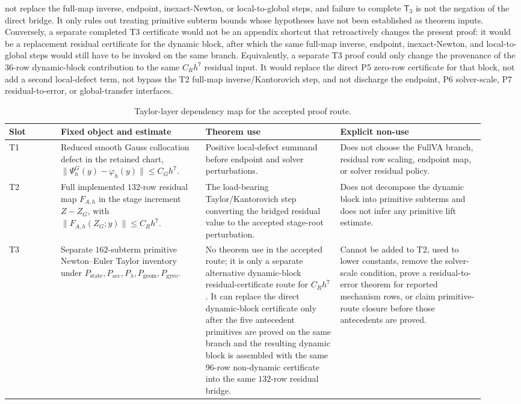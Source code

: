 \documentclass[preprint,12pt]{elsarticle}
\begin{document}
not replace the full-map inverse, endpoint, inexact-Newton, or local-to-global
steps, and failure to complete \(\mathsf T_3\) is not the negation of the
direct bridge.  It only rules out treating primitive subterm bounds whose
hypotheses have not been established as theorem inputs.
Conversely, a separate completed T3 certificate would not be an appendix shortcut that
retroactively changes the present proof: it would be a replacement residual
certificate for the dynamic block, after which the same full-map inverse,
endpoint, inexact-Newton, and local-to-global steps would still have to be
invoked on the same branch.
Equivalently, a separate T3 proof could only change the provenance of the
36-row dynamic-block contribution to the same \(C_Rh^7\) residual input.  It
would replace the direct P5 zero-row certificate for that block, not add a
second local-defect term, not bypass the T2 full-map inverse/Kantorovich
step, and not discharge the endpoint, P6 solver-scale, P7 residual-to-error,
or global-transfer interfaces.

\begin{table}[htbp]
\centering
\caption{Taylor-layer dependency map for the accepted proof route.}
\label{tab:taylor-layer-consumption-ledger}
\scriptsize
\setlength{\tabcolsep}{2pt}
\renewcommand{\arraystretch}{0.92}
\begin{tabular}{P{0.10\linewidth}P{0.28\linewidth}P{0.26\linewidth}P{0.28\linewidth}}
\toprule
Slot & Fixed object and estimate & Theorem use & Explicit non-use \\
\midrule
T1 &
Reduced smooth Gauss collocation defect in the retained chart,
\(\|\Psi_h^G(y)-\varphi_h(y)\|\le C_Gh^7\). &
Positive local-defect summand before endpoint and solver perturbations. &
Does not choose the FullVA branch, residual row scaling, endpoint map, or
solver residual policy. \\
T2 &
Full implemented \(132\)-row residual map \(F_{A,h}\) in the stage increment
\(Z-Z_G\), with \(\|F_{A,h}(Z_G;y)\|\le C_Rh^7\). &
The load-bearing Taylor/Kantorovich step converting the bridged residual value
to the accepted stage-root perturbation. &
Does not decompose the dynamic block into primitive subterms and does not
infer any primitive lift estimate. \\
T3 &
Separate \(162\)-subterm primitive Newton--Euler Taylor inventory under
\(P_{\mathrm{state}},P_{\mathrm{acc}},P_{\lambda},
P_{\mathrm{geom}},P_{\mathrm{gyro}}\). &
No theorem use in the accepted route; it is only a separate alternative
dynamic-block residual-certificate route for \(C_Rh^7\).
It can replace the direct dynamic-block certificate only after the five
antecedent primitives are proved on the same branch and the resulting
dynamic block is assembled with the same 96-row non-dynamic certificate into
the same \(132\)-row residual bridge. &
Cannot be added to T2, used to lower constants, remove the solver-scale
condition, prove a residual-to-error theorem for reported mechanism rows, or
claim primitive-route closure before those antecedents are proved. \\
\bottomrule
\end{tabular}
\end{table}
\end{document}
